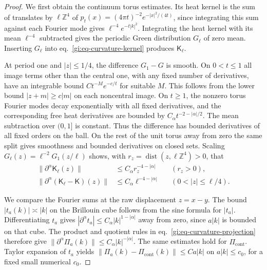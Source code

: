 \documentclass[11pt,letterpaper,reqno]{amsart}
\numberwithin{equation}{section}
\renewcommand{\eqref}[1]{\textup{eq.~\ref{#1}}}
\theoremstyle{definition}
\theoremstyle{remark}
\begin{document}
\begin{proof}
We first obtain the continuum torus estimates. Its heat kernel is
the sum of translates by \(\ell\mathbb Z^4\) of
\(p_t(x)=(4\pi t)^{-2}e^{-|x|^2/(4t)}\), since integrating
this sum against each Fourier mode gives
\(\ell^{-4}e^{-t|k|^2}\). Integrating the heat kernel with
its mean \(\ell^{-4}\) subtracted gives the periodic Green
distribution \(G_\ell\) of zero mean. Inserting \(G_\ell\)
into \eqref{gi:eq-curvature-kernel} produces \(\mathsf K_\ell\).

At period one and \(|z|\le1/4\), the difference \(G_1-G\)
is smooth. On \(0<t\le1\) all image terms other than the
central one, with any fixed number of derivatives, have an
integrable bound \(C t^{-M}e^{-c/t}\) for suitable \(M\).
This follows from the lower bound \(|z+m|\ge c|m|\) on each
noncentral image. On \(t\ge1\), the nonzero torus Fourier
modes decay exponentially with all fixed derivatives, and
the corresponding free heat derivatives are bounded by
\(C_\alpha t^{-2-|\alpha|/2}\). The mean subtraction over
\((0,1]\) is constant. Thus the difference has bounded
derivatives of all fixed orders on the ball. On the rest of the
unit torus away from zero the same split gives smoothness
and bounded derivatives on closed sets. Scaling
\(G_\ell(z)=\ell^{-2}G_1(z/\ell)\) shows, with
\(r_z=\operatorname{dist}(z,\ell\mathbb Z^4)>0\), that
\begin{equation}\label{gi:eq-free-torus-green-bounds}
 \begin{aligned}
 \|\partial^\alpha\mathsf K_\ell(z)\|
       &\le C_\alpha r_z^{-4-|\alpha|} &&(r_z>0),\\
 \|\partial^\alpha(\mathsf K_\ell-\mathsf K)(z)\|
       &\le C_\alpha\ell^{-4-|\alpha|}
                         &&(0<|z|\le\ell/4).
 \end{aligned}
\end{equation}

We compare the Fourier sums at the raw displacement \(z=x-y\).
The bound \(|t_a(k)|\asymp|k|\) on the Brillouin cube follows
from the sine formula for \(|t_a|\).
Differentiating \(t_a\) gives
\(|\partial^\alpha t_a|\le C_\alpha|k|^{1-|\alpha|}\)
away from zero, since \(a|k|\) is bounded on that cube.
The product and quotient rules in \eqref{gi:eq-curvature-projection}
therefore give
\(\|\partial^\alpha\Pi_a(k)\|\le C_\alpha|k|^{-|\alpha|}\).
The same estimates hold for \(\Pi_{\mathrm{cont}}\). Taylor
expansion of \(t_a\) yields
\(\|\Pi_a(k)-\Pi_{\mathrm{cont}}(k)\|\le Ca|k|\) on
\(a|k|\le c_0\), for a fixed small numerical \(c_0\).


\end{proof}
\end{document}
